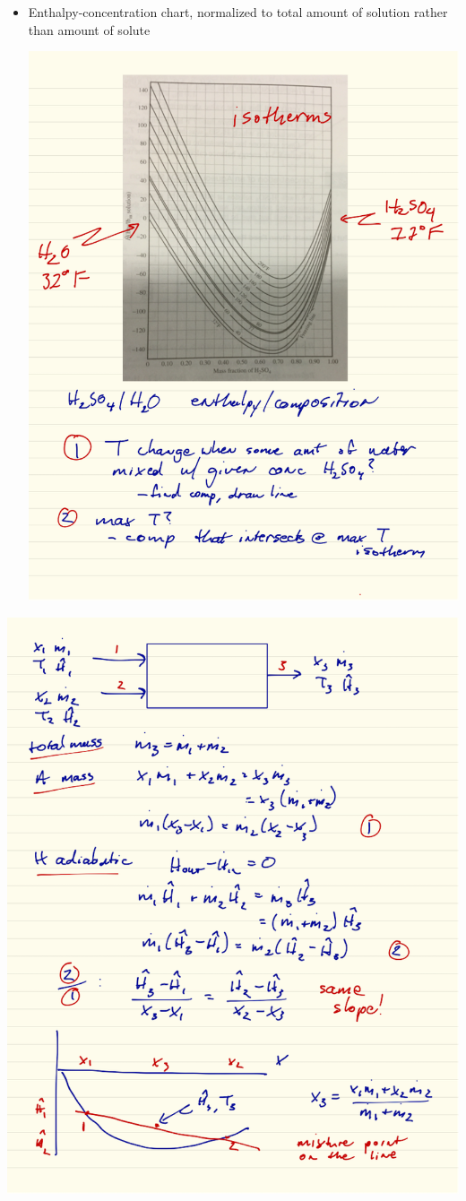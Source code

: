 \documentclass[11pt]{article}
\begin{document}
\begin{itemize}
\item Enthalpy-concentration chart, normalized to total amount of solution rather than amount of solute

\includegraphics[width=.9\linewidth]{./figs/Formation.png}
\end{itemize}

\includegraphics[width=.9\linewidth]{./figs/TieLine.png}
\end{document}
